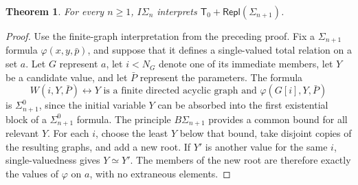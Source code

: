 \documentclass[11pt,a4paper]{article}
\newcommand{\IS}[1]{I\Sigma_{#1}}
\newcommand{\Tzero}{\mathsf T_{0}}
\newcommand{\Repl}[1]{\mathsf{Repl}(#1)}
\theoremstyle{plain}
\newtheorem{theorem}{Theorem}[section]
\theoremstyle{definition}
\theoremstyle{remark}
\begin{document}
\begin{theorem}
  For every \(n\geq1\), \(\IS{n}\) interprets \(\Tzero+\Repl{\Sigma_{n+1}}\).
\end{theorem}
\begin{proof}
  Use the finite-graph interpretation from the preceding proof. Fix a \(\Sigma_{n+1}\) formula \(\varphi(x,y,\bar p)\), and suppose that it defines a single-valued total relation on a set \(a\). Let \(G\) represent \(a\), let \(i<N_G\) denote one of its immediate members, let \(Y\) be a candidate value, and let \(\bar P\) represent the parameters. The formula
  \[
    W(i,Y,\bar P)\longleftrightarrow
    Y\text{ is a finite directed acyclic graph and }
    \varphi(G[i],Y,\bar P)
  \]
  is \(\Sigma_{n+1}^0\), since the initial variable \(Y\) can be absorbed into the first existential block of a \(\Sigma_{n+1}^0\) formula. The principle \(B\Sigma_{n+1}\) provides a common bound for all relevant \(Y\). For each \(i\), choose the least \(Y\) below that bound, take disjoint copies of the resulting graphs, and add a new root. If \(Y'\) is another value for the same \(i\), single-valuedness gives \(Y\simeq Y'\). The members of the new root are therefore exactly the values of \(\varphi\) on \(a\), with no extraneous elements.
\end{proof}
\end{document}
